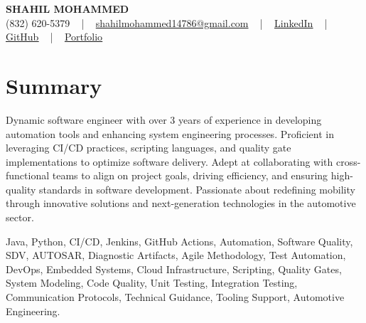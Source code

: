 \documentclass[letterpaper,10pt]{article}
\begin{document}
\begin{center}
    {\fontsize{14pt}{12pt}\selectfont \textbf{\MakeUppercase{Shahil Mohammed}}}\\ \vspace{2pt}
    \fontsize{10pt}{12pt}\selectfont (832) 620-5379 ~ | ~ \href{mailto:shahilmohammed14786@gmail.com}{shahilmohammed14786@gmail.com} ~ | ~  
    \href{https://www.linkedin.com/in/shahil-mohammed-9652931a1/}{\color{blue}\underline{LinkedIn}}  ~ | ~ 
    \href{https://github.com/freakbeast14}{\color{blue}\underline{GitHub}} ~ | ~ 
    \href{https://shahil-mohammed.netlify.app/}{\color{blue}\underline{Portfolio}}
    \vspace{-8pt}
\end{center}

\section{Summary}
\vspace{-2pt}\fontsize{8pt}{9pt}\selectfont
Dynamic software engineer with over 3 years of experience in developing automation tools and enhancing system engineering processes. Proficient in leveraging CI/CD practices, scripting languages, and quality gate implementations to optimize software delivery. Adept at collaborating with cross-functional teams to align on project goals, driving efficiency, and ensuring high-quality standards in software development. Passionate about redefining mobility through innovative solutions and next-generation technologies in the automotive sector.
 \vspace{-5pt}
 
{\fontsize{1pt}{1pt}\selectfont\color{white}
Java, Python, CI/CD, Jenkins, GitHub Actions, Automation, Software Quality, SDV, AUTOSAR, Diagnostic Artifacts, Agile Methodology, Test Automation, DevOps, Embedded Systems, Cloud Infrastructure, Scripting, Quality Gates, System Modeling, Code Quality, Unit Testing, Integration Testing, Communication Protocols, Technical Guidance, Tooling Support, Automotive Engineering.
}
\vspace{-8pt}

\vspace{-2pt}
\end{document}
